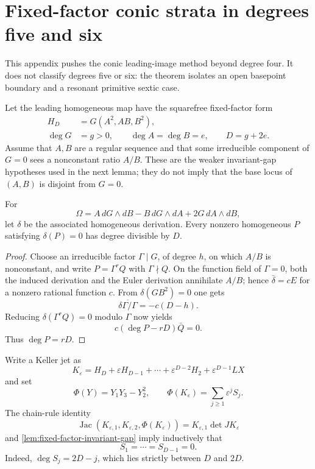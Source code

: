 \section{Fixed-factor conic strata in degrees five and six}
\label{app:degree-five-six}

This appendix pushes the conic leading-image method beyond degree four.  It
does not classify degrees five or six: the theorem isolates an open
basepoint boundary and a resonant primitive sextic case.

Let the leading homogeneous map have the squarefree fixed-factor form
\[
\begin{aligned}
H_D&=G(A^2,AB,B^2),\\
\deg G&=g>0,\qquad \deg A=\deg B=e,\qquad D=g+2e.
\end{aligned}
\]
Assume that \(A,B\) are a regular sequence and that some irreducible
component of \(G=0\) sees a nonconstant ratio \(A/B\).  These are the
weaker invariant-gap hypotheses used in the next lemma; they do not imply
that the base locus of \((A,B)\) is disjoint from \(G=0\).

\begin{lemma}
\label{lem:fixed-factor-invariant-gap}
For
\[
\Omega=A\,dG\wedge dB-B\,dG\wedge dA+2G\,dA\wedge dB,
\]
let \(\delta\) be the associated homogeneous derivation.  Every nonzero
homogeneous \(P\) satisfying \(\delta(P)=0\) has degree divisible by \(D\).
\end{lemma}

\begin{proof}
Choose an irreducible factor \(\Gamma\mid G\), of degree \(h\), on which
\(A/B\) is nonconstant, and write \(P=\Gamma^rQ\) with
\(\Gamma\nmid Q\).  On the function field of \(\Gamma=0\), both the induced
derivation and the Euler derivation annihilate \(A/B\); hence
\(\bar\delta=cE\) for a nonzero rational function \(c\).  From
\(\delta(GB^2)=0\) one gets
\[
\overline{\delta\Gamma/\Gamma}=-c(D-h).
\]
Reducing \(\delta(\Gamma^rQ)=0\) modulo \(\Gamma\) now yields
\[
c(\deg P-rD)\bar Q=0.
\]
Thus \(\deg P=rD\).
\end{proof}

Write a Keller jet as
\[
K_\varepsilon
=H_D+\varepsilon H_{D-1}+\cdots+\varepsilon^{D-2}H_2
+\varepsilon^{D-1}LX
\]
and set
\[
\Phi(Y)=Y_1Y_3-Y_2^2,\qquad
\Phi(K_\varepsilon)=\sum_{j\ge1}\varepsilon^jS_j.
\]
The chain-rule identity
\[
\operatorname{Jac}(K_{\varepsilon,1},K_{\varepsilon,2},\Phi(K_\varepsilon))
=K_{\varepsilon,1}\det JK_\varepsilon
\]
and \cref{lem:fixed-factor-invariant-gap} imply inductively that
\[
S_1=\cdots=S_{D-1}=0.
\]
Indeed, \(\deg S_j=2D-j\), which lies strictly between \(D\) and \(2D\).


